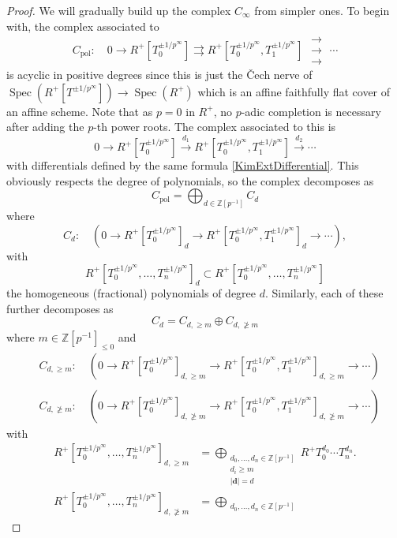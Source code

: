 \documentclass[10pt,twoside]{article}
\numberwithin{equation}{section}
\theoremstyle{plain}
\theoremstyle{definition}
\DeclareMathOperator{\Spec}{Spec}
\newcommand{\ZZ}{\mathbb{Z}}
\newcommand{\Cech}{\v{C}ech }
\DeclareMathOperator{\pol}{pol}
\newcommand{\pRoots}{{1/p^\infty}}
\newcommand{\ZZip}{\ZZ[p^{-1}]}
\newcommand{\rrrarrows}{\;\substack{\rightarrow\\[-1em] \rightarrow \\[-1em] \rightarrow}\;}
\begin{document}
\begin{proof}
    We will gradually build up the complex \(C_\infty\) from simpler ones. To begin with, the complex associated to 
    \[C_{\pol}\colon \quad 0\longrightarrow R^+ [T_0^{\pm \pRoots}] \rightrightarrows R^+[ T_0^{\pm \pRoots},T_1^{\pm \pRoots}]  \rrrarrows \cdots\]
    is acyclic in positive degrees since this is just the \Cech nerve of \(\Spec(R^+[T^{\pm 1/p^\infty}])\to \Spec(R^+)\) which is an affine faithfully flat cover of an affine scheme. Note that as \(p=0\) in \(R^+\), no \(p\)-adic completion is necessary after adding the \(p\)-th power roots. The complex associated to this is
    \[0\longrightarrow R^+ [T_0^{\pm\pRoots}] \xrightarrow{d_1} R^+[T_0^{\pm\pRoots},T_1^{\pm\pRoots}] \xrightarrow{d_2}\cdots\]
    with differentials defined by the same formula \eqref{KimExtDifferential}. This obviously respects the degree of polynomials, so the complex decomposes as
    \[C_{\pol}=\bigoplus_{d\in \ZZip} C_{d}\]
    where
    \[C_{d}\colon\quad\left(0\longrightarrow R^+ [T_0^{\pm\pRoots}]_d \longrightarrow R^+[T_0^{\pm\pRoots},T_1^{\pm\pRoots}]_d \longrightarrow\cdots\right),\]
    with 
    \[R^+[T_0^{\pm\pRoots},\dots,T_n^{\pm\pRoots}]_d\subset R^+[T_0^{\pm\pRoots},\dots,T_n^{\pm\pRoots}]\]
    the homogeneous (fractional) polynomials of degree \(d\). Similarly, each of these further decomposes as 
    \[C_{d}= C_ {d,\geq m} \oplus C_{d,\ngeq m}\]
    where  \(m\in \ZZip_{\leq 0}\) and
    \begin{align*}
        &C_{d,\geq m}\colon \quad \left(0\longrightarrow R^+[T_0^{\pm\pRoots}]_{d,\geq m}\longrightarrow R^+[T_0^{\pm\pRoots}, T_1^{\pm\pRoots}]_{d,\geq m}\longrightarrow\cdots\right) \\\\
        &C_{d,\ngeq m}\colon \quad\left(0\longrightarrow R^+[T_0^{\pm\pRoots}]_{d,\ngeq m}\longrightarrow R^+[T_0^{\pm\pRoots}, T_1^{\pm\pRoots}]_{d,\ngeq m}\longrightarrow\cdots\right) 
    \end{align*}
    with
    \begin{align*}
        R^+[T_0^{\pm\pRoots},\dots,T_n^{\pm\pRoots}]_{d,\geq m} 
        &= 
        \bigoplus_{\substack{d_0,\dots,d_n\in \ZZ[p^{-1}]\\
        d_i\geq m\\
        |\mathbf d|=d}}
        R^+ T_0^{d_0}\cdots T_n^{d_n}.
        \\
        R^+[T_0^{\pm\pRoots},\dots,T_n^{\pm\pRoots}]_{d,\ngeq m} 
        &= 
        \bigoplus_{\substack{d_0,\dots,d_n\in \ZZ[p^{-1}]\\
}}
\end{align*}
\end{proof}
\end{document}
